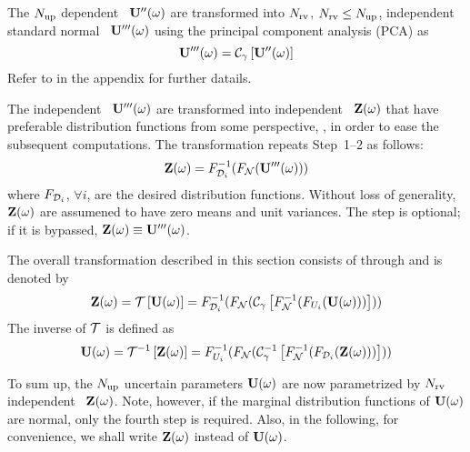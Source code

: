 The ${N_\text{up}}$ dependent \rvs\ $\mathbf{U}''(\omega)$ are transformed into ${N_\text{rv}}$, ${N_\text{rv}} \leq {N_\text{up}}$, independent standard normal \rvs\ $\mathbf{U}'''(\omega)$ using the principal component analysis (PCA) as
\begin{equation} \elabel{independent-normal}
  \vU'''(\o) = \oPCA{\vU''(\o)}
\end{equation}
Refer to  in the appendix for further datails.

 The independent \rvs\ $\mathbf{U}'''(\omega)$ are transformed into independent \rvs\ $\mathbf{Z}(\omega)$ that have preferable distribution functions from some perspective, \eg, in order to ease the subsequent computations. The transformation repeats Step~1--2 as follows:
\begin{equation} \elabel{independent-desired}
  \vZ(\o) = \CDF^{-1}_{\desired_i}(\CDF_\normal(\vU'''(\o)))
\end{equation}
where $F_{\mathcal{D}_i}$, $\forall i$, are the desired distribution functions. Without loss of generality, $\mathbf{Z}(\omega)$ are assumened to have zero means and unit variances. The step is optional; if it is bypassed, $\mathbf{Z}(\omega) \equiv \mathbf{U}'''(\omega)$.

The overall transformation described in this section consists of  through  and is denoted by
\[
  \vZ(\o) = \oT{\vU(\o)} = \CDF^{-1}_{\desired_i}(\CDF_\normal(\oPCA{\CDF_\normal^{-1}(\CDF_{\U_i}(\vU(\o)))}))
\]
The inverse of $\oT$ is defined as
\begin{equation} \elabel{parametrization}
  \vU(\o) = \oInvT{\vZ(\o)} = \CDF_{\U_i}^{-1}(\CDF_\normal(\oInvPCA{\CDF^{-1}_\normal(\CDF_{\desired_i}(\vZ(\o)))}))
\end{equation}

To sum up, the ${N_\text{up}}$ uncertain parameters $\mathbf{U}(\omega)$ are now parametrized by ${N_\text{rv}}$ independent \rvs\ $\mathbf{Z}(\omega)$. Note, however, if the marginal distribution functions of $\mathbf{U}(\omega)$ are normal, only the fourth step is required. Also, in the following, for convenience, we shall write $\mathbf{Z}(\omega)$ instead of $\mathbf{U}(\omega)$.
